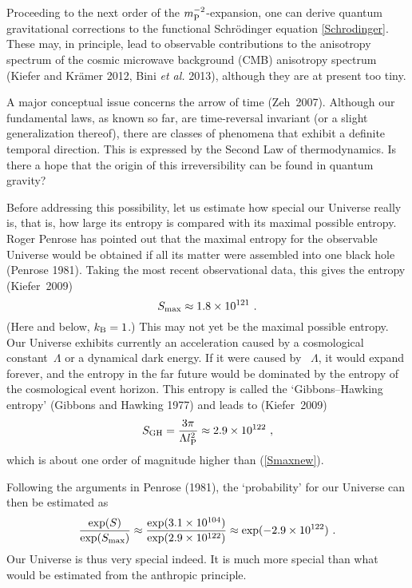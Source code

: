 \documentclass[12pt,a4paper]{article}
\newcommand{\be}{\begin{equation}}
\newcommand{\ee}{\end{equation}}
\newcommand{\lb}{\label}
\begin{document}
Proceeding to the next order of the $m_{\rm P}^{-2}$-expansion, one
can derive quantum gravitational corrections to the functional
Schr\"odinger equation \eqref{Schrodinger}. These may, in principle, lead to
observable contributions to the anisotropy spectrum of the cosmic
microwave background (CMB) anisotropy spectrum (Kiefer and Kr\"amer
2012, Bini {\em et al.} 2013), although they are at present too tiny. 

A major conceptual issue concerns the arrow of time
(Zeh~2007). Although our fundamental laws, as known so far, are
time-reversal invariant (or a slight generalization thereof), there
are classes of phenomena that exhibit a definite temporal
direction. This is expressed by the Second Law of thermodynamics. 
Is there a hope that the origin of this irreversibility can be found in
quantum gravity?

Before addressing this possibility, let us estimate how special our
Universe really is, that is, how large its entropy is compared with its
maximal possible entropy.
Roger Penrose has pointed out that the maximal
entropy for the observable Universe would be obtained if all its
matter were assembled into one black hole (Penrose 1981).
Taking the most recent
observational data, this gives the entropy (Kiefer~2009)
\be
\lb{Smaxnew}
S_{\rm max}\approx 1.8\times 10^{121} \ . 
\ee
(Here and below, $k_{\rm B}=1$.)
This may not yet be the maximal possible entropy. Our Universe
exhibits currently an acceleration caused by a
cosmological constant~$\Lambda$ or a dynamical dark energy. If it were
caused by ~$\Lambda$, it would expand 
forever, and the entropy in the far future would be dominated by the
entropy of the cosmological event horizon. This entropy is called
the `Gibbons--Hawking entropy' (Gibbons and Hawking 1977)
and leads to (Kiefer~2009)
\be
\lb{Sgh}
S_{\rm GH}=\frac{3\pi}{\Lambda l_{\rm P}^2}\approx 2.9\times
10^{122}\ ,
\ee
which is about one order of magnitude higher than (\ref{Smaxnew}).

Following the arguments in Penrose (1981), the `probability' for
our Universe can then be estimated as
\be
\frac{\exp(S)}{\exp(S_{\rm max})}\approx \frac{\exp(3.1\times
  10^{104})}{\exp(2.9\times 10^{122})}\approx \exp(-2.9\times
10^{122})\ .
\ee
Our Universe is thus very special indeed. It is much more special than
what would be estimated from the anthropic principle. 
\end{document}
